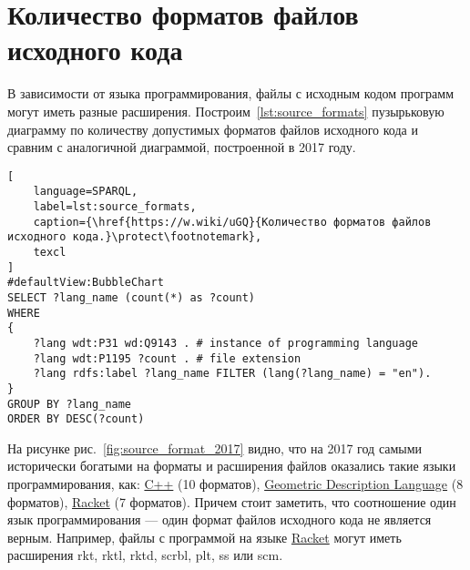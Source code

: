 \section{Количество форматов файлов исходного кода}
В зависимости от языка программирования, файлы с исходным кодом программ могут иметь разные расширения. Построим~\ref{lst:source_formats} пузырьковую диаграмму по количеству допустимых форматов файлов исходного кода и сравним с аналогичной диаграммой, построенной в 2017 году.

\begin{lstlisting}[
	language=SPARQL,
	label=lst:source_formats,
	caption={\href{https://w.wiki/uGQ}{Количество форматов файлов исходного кода.}\protect\footnotemark},
	texcl
]
#defaultView:BubbleChart
SELECT ?lang_name (count(*) as ?count)
WHERE
{
    ?lang wdt:P31 wd:Q9143 . # instance of programming language
 	?lang wdt:P1195 ?count . # file extension
 	?lang rdfs:label ?lang_name FILTER (lang(?lang_name) = "en").
}
GROUP BY ?lang_name 
ORDER BY DESC(?count)
\end{lstlisting}

На рисунке рис.~\ref{fig:source_format_2017} видно, что на 2017 год самыми исторически богатыми на форматы и расширения файлов оказались такие языки программирования, как: \href{https://en.wikipedia.org/wiki/C++}{C++} (10 форматов), \href{https://en.wikipedia.org/wiki/Geometric_Description_Language}{Geometric Description Language} (8 форматов), \href{https://en.wikipedia.org/wiki/Racket_(programming_language)}{Racket} (7 форматов). Причем стоит заметить, что соотношение один язык программирования --- один формат файлов исходного кода не является верным. Например, файлы с программой на языке \href{https://en.wikipedia.org/wiki/Racket_(programming_language)}{Racket} могут иметь расширения rkt, rktl, rktd, scrbl, plt, ss или scm.

